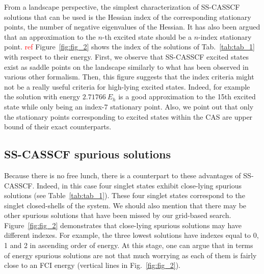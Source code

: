 \documentclass[aps,prb,reprint,showkeys,superscriptaddress]{revtex4-1}
\newcommand{\todo}[1]{\textcolor{red}{#1}}
\begin{document}
From a landscape perspective, the simplest characterization of SS-CASSCF solutions that can be used is the Hessian index of the corresponding stationary points, \ie the number of negative eigenvalues of the Hessian.
It has also been argued that an approximation to the $n$-th excited state should be a $n$-index stationary point. \todo{ref}
Figure~\ref{fig:fig_2} shows the index of the solutions of Tab.~\ref{tab:tab_1} with respect to their energy.
First, we observe that SS-CASSCF excited states exist as saddle points on the landscape similarly to what has been observed in various other formalism. \cite{Gilbert_2008,Hait_2021,Kossoski_2021}
Then, this figure suggests that the index criteria might not be a really useful criteria for high-lying excited states.
Indeed, for example the solution with energy $2.71766~E_h$ is a good approximation to the 15th excited state while only being an index-7 stationary point.
Also, we point out that only the stationary points corresponding to excited states within the CAS are upper bound of their exact counterparts. \cite{Helgaker_2000,Mahler_2021}

\subsection{SS-CASSCF spurious solutions}
\label{sec:spurious}

Because there is no free lunch, there is a counterpart to these advantages of SS-CASSCF.
Indeed, in this case four singlet states exhibit close-lying spurious solutions (see Table~\ref{tab:tab_1}).
These four singlet states correspond to the singlet closed-shells of the system.
We should also mention that there may be other spurious solutions that have been missed by our grid-based search.
Figure~\ref{fig:fig_2} demonstrates that close-lying spurious solutions may have different indexes.
For example, the three lowest solutions have indexes equal to 0, 1 and 2 in ascending order of energy.
At this stage, one can argue that in terms of energy spurious solutions are not that much worrying as each of them is fairly close to an FCI energy (vertical lines in  Fig.~\ref{fig:fig_2}).
\end{document}
